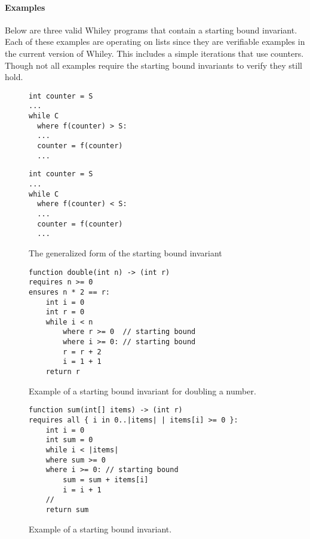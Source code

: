 \paragraph{Examples}

Below are three valid Whiley programs that contain a starting bound
invariant.
Each of these examples are operating on lists since they are verifiable
examples in the current version of Whiley.
This includes a simple iterations that use counters. Though not all
examples require the starting bound invariants to verify they still hold.


\begin{figure}[ht]
\noindent\begin{minipage}{.45\textwidth}
\begin{lstlisting}
int counter = S
...
while C
  where f(counter) > S:
  ... 
  counter = f(counter)
  ...
\end{lstlisting}

\end{minipage}\hfill
\begin{minipage}{.45\textwidth}
\begin{lstlisting}
int counter = S
...
while C
  where f(counter) < S:
  ... 
  counter = f(counter)
  ...
\end{lstlisting}	
\end{minipage}\hfill
\caption{The generalized form of the starting bound invariant}
\label{lst:starting-bound-gen}
\end{figure}


\begin{figure}[ht]
\begin{lstlisting}
function double(int n) -> (int r)
requires n >= 0
ensures n * 2 == r:
	int i = 0
	int r = 0
	while i < n
		where r >= 0  // starting bound
		where i >= 0: // starting bound
		r = r + 2
		i = 1 + 1
	return r
\end{lstlisting}
\caption{Example of a starting bound invariant for doubling a number.}
\label{lst:starting-bound-fib}
\end{figure}


\begin{figure}[ht]
\begin{lstlisting}
function sum(int[] items) -> (int r)
requires all { i in 0..|items| | items[i] >= 0 }:
    int i = 0
    int sum = 0
    while i < |items|
    where sum >= 0
    where i >= 0: // starting bound
        sum = sum + items[i]
        i = i + 1
    //
    return sum
\end{lstlisting}
\caption{Example of a starting bound invariant.}
\label{lst:starting-bound-sum}
\end{figure}

